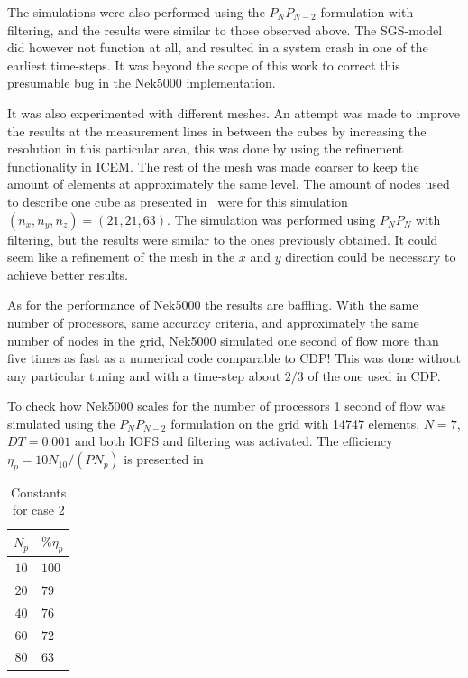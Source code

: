 The simulations were also performed using the $P_NP_{N-2}$ formulation with filtering, and the 
results were similar to those observed above. The SGS-model did however not function at all, 
and resulted in a system crash in one of the earliest time-steps. It was beyond the scope of 
this work to correct this presumable bug in the Nek5000 implementation. 

It was also experimented with different meshes. An attempt was made to improve the 
results at the measurement lines in between the cubes by increasing the resolution in
this particular area, this was done by using the refinement functionality in ICEM.
The rest of the mesh was made coarser to keep the amount of elements at approximately the 
same level. The amount of nodes used to describe one cube as presented in~ 
were for this simulation $(n_x,n_y,n_z) = (21,21,63)$.
The simulation was performed using $P_NP_N$ with filtering, but the results were 
similar to the ones previously obtained. It could seem like a refinement of the 
mesh in the $x$ and $y$ direction could be necessary to achieve better results. 

As for the performance of Nek5000 the results are baffling. With the same number of processors,
same accuracy criteria, and approximately the same number of nodes in the grid, Nek5000 simulated
one second of flow more than five times as fast as a numerical code comparable to CDP! 
This was done without any particular tuning and with a time-step about $2/3$ of the one used in 
CDP. 

To check how Nek5000 scales for the number of processors 1 second of flow was 
simulated using the $P_NP_{N-2}$ formulation on the grid with 14747 elements,
$N=7$, $DT = 0.001$ and both 
IOFS and filtering was activated. The efficiency $\eta_p = 10 N_{10}/(PN_p)$
is presented in~
%
\begin{table}[h]
    \centering
    \begin{tabular}{c l }
     $N_p$ & $\%\eta_p  $  \\ \hline
    $10$ &$100$\\
    $20$ &$79$ \\
    $40$ &$76$ \\
    $60$ &$72$ \\
    $80$ &$63$ \\ 
    \end{tabular}
    \caption{Constants for case 2}
    \label{tab:perfgas}
\end{table}


